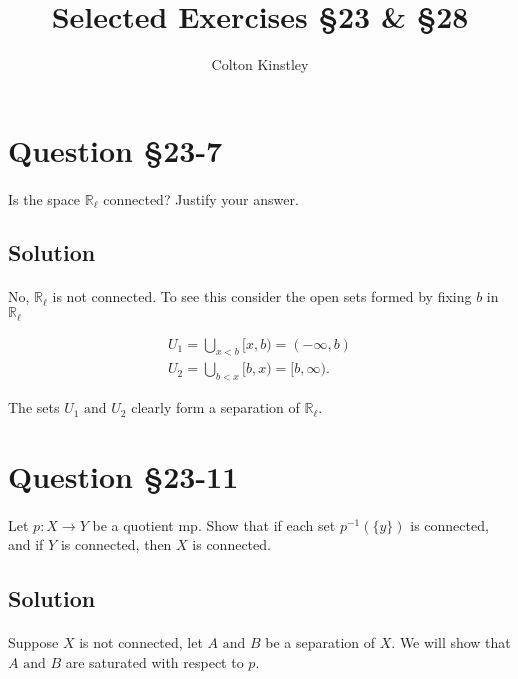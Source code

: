 \documentclass[11pt, oneside]{article}   	%
\title{Selected Exercises \S23 \& \S28}
\author{Colton Kinstley}
\newcommand{\R}{\mathbb{R}}
\newcommand{\tand}{\text{ and }}
\newcommand{\set}[1]{\{ #1 \}}
\begin{document}
\maketitle

\section*{Question \S23-7}
\paragraph{}

Is the space $\R_\ell$ connected? Justify your answer.

\subsection*{Solution}
\paragraph{}

No, $\R_\ell$ is not connected. To see this consider the open sets formed by fixing $b$ in $\R_\ell$

\begin{eqnarray*}
U_1 = \bigcup_{x<b}[x,b) = (-\infty, b) \\
U_2 = \bigcup_{b<x}[b,x) = [b,\infty).
\end{eqnarray*}

The sets $U_1 \tand U_2$ clearly form a separation of $\R_\ell$.

\section*{Question \S23-11}
\paragraph{}
Let $p:X \to Y$ be a quotient mp. Show that if each set $p^{-1}(\set{y})$ is connected, and if $Y$ is connected, then $X$ is connected.

\subsection*{Solution}
\paragraph{}

Suppose $X$ is not connected, let $A \tand B$ be a separation of $X$. We will show that $A \tand B$ are saturated with respect to $p$. 
\end{document}
